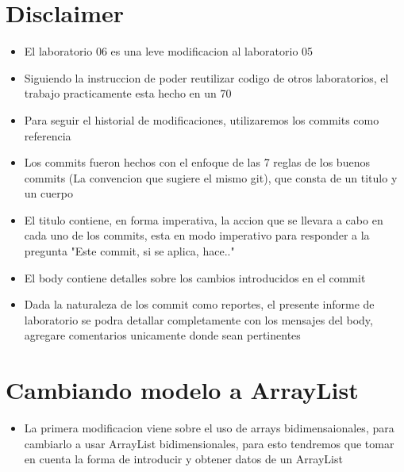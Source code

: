 \section{Disclaimer}
\begin{itemize}
    \item El laboratorio 06 es una leve modificacion al laboratorio 05
    \item Siguiendo la instruccion de poder reutilizar codigo de otros laboratorios, el trabajo practicamente esta hecho en un 70%
    \item Para seguir el historial de modificaciones, utilizaremos los commits como referencia
    \item Los commits fueron hechos con el enfoque de las 7 reglas de los buenos commits (La convencion que sugiere el mismo git), que consta de un titulo y un cuerpo
    \item El titulo contiene, en forma imperativa, la accion que se llevara a cabo en cada uno de los commits, esta en modo imperativo para responder a la pregunta "Este commit, si se aplica, hace.." 
    \item El body contiene detalles sobre los cambios introducidos en el commit
    \item Dada la naturaleza de los commit como reportes, el presente informe de laboratorio se podra detallar completamente con los mensajes del body, agregare comentarios unicamente donde sean pertinentes
\end{itemize}
\section{Cambiando modelo a ArrayList}
\begin{itemize}
    \item La primera modificacion viene sobre el uso de arrays bidimensaionales, para cambiarlo a usar ArrayList bidimensionales, para esto tendremos que tomar en cuenta la forma de introducir y obtener datos de un ArrayList
\end{itemize}

